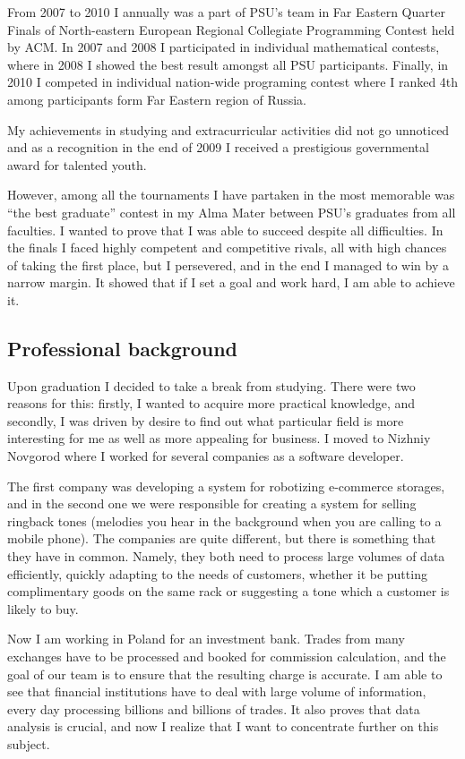 \documentclass[a4paper,12pt]{article}
\begin{document}
From 2007 to 2010 I annually was a part of PSU's team in Far Eastern Quarter Finals of North-eastern European Regional Collegiate Programming Contest held by ACM. In 2007 and 2008 I participated in individual mathematical contests, where in 2008 I showed the best result amongst all PSU participants. Finally, in 2010 I competed in individual nation-wide programing contest where I ranked 4th among participants form Far Eastern region of Russia.

My achievements in studying and extracurricular activities did not go unnoticed and as a recognition in the end of 2009 I received a prestigious governmental award for talented youth.

However, among all the tournaments I have partaken in the most memorable was ``the best graduate'' contest in my Alma Mater between PSU's graduates from all faculties. I wanted to prove that I was able to succeed despite all difficulties. In the finals I faced highly competent and competitive rivals, all with high chances of taking the first place, but I persevered, and in the end I managed to win by a narrow margin. It showed that if I set a goal and work hard, I am able to achieve it.


\subsection*{Professional background}

Upon graduation I decided to take a break from studying. There were two reasons for this: firstly, I wanted to acquire more practical knowledge, and secondly, I was driven by desire to find out what particular field is more interesting for me as well as more appealing for business. I moved to Nizhniy Novgorod where I worked for several companies as a software developer.

The first company was developing a system for robotizing e-commerce storages, and in the second one we were responsible for creating a system for selling ringback tones (melodies you hear in the background when you are calling to a mobile phone). The companies are quite different, but there is something that they have in common. Namely, they both need to process large volumes of data efficiently, quickly adapting to the needs of customers, whether it be putting complimentary goods on the same rack or suggesting a tone which a customer is likely to buy.

Now I am working in Poland for an investment bank. Trades from many exchanges have to be processed and booked for commission calculation, and the goal of our team is to ensure that the resulting charge is accurate. I am able to see that financial institutions have to deal with large volume of information, every day processing billions and billions of trades. It also proves that data analysis is crucial, and now I realize that I want to concentrate further on this subject.
\end{document}
